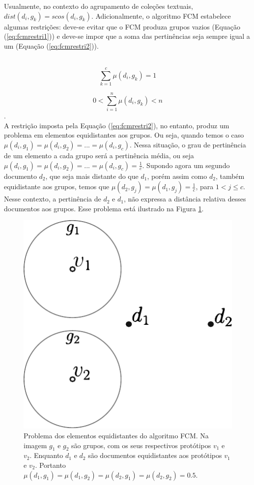 Usualmente, no contexto do agrupamento de coleções textuais, $dist(d_i,g_k) = scos(d_i,g_k)$.
Adicionalmente, o algoritmo FCM estabelece algumas restrições: deve-se evitar que o FCM produza
grupos vazios (Equação (\ref{eq:fcmrestri1})) e deve-se impor que a soma das pertinências seja
sempre igual a um (Equação (\ref{eq:fcmrestri2})).

\leavevmode\\
\begin{equation} \sum_{k=1}^c
  \mu(d_i,g_k) = 1 \label{eq:fcmrestri1} 
\end{equation}

\begin{equation} 0 < \sum_{i=1}^n
  \mu(d_i,g_k) < n \label{eq:fcmrestri2} 
\end{equation}. 
\leavevmode\\

A restrição imposta pela Equação (\ref{eq:fcmrestri2}), no entanto, produz um problema em elementos
equidistantes aos grupos. Ou seja, quando temos o caso $\mu(d_i, g_1) = \mu(d_i, g_2) = ... =
\mu(d_i, g_c)$. Nessa situação, o grau de pertinência de um elemento a cada grupo será a pertinência
média, ou seja $\mu(d_i, g_1) = \mu(d_i, g_2) = ... = \mu(d_i, g_c) = \frac{1}{c}$. Supondo agora um
segundo documento $d_2$, que seja mais distante do que $d_1$, porém assim como $d_2$, também
equidistante aos grupos, temos que $\mu(d_2, g_j) = \mu(d_1, g_j) = \frac{1}{c}$, para $1 < j \leq
c$. Nesse contexto, a pertinência de $d_2$ e $d_1$, não expressa a distância relativa desses
documentos aos grupos. Esse problema está ilustrado na Figura \ref{fig:fcm_problem}.

\begin{figure}[!htp] \centering
  \includegraphics[width=0.4\columnwidth]{assets/fcm_problem.pdf} 
  \caption{Problema dos
    elementos equidistantes do algoritmo FCM. Na imagem $g_1$ e $g_2$ são grupos, com os seus
    respectivos protótipos $v_1$ e $v_2$. Enquanto $d_1$ e $d_2$ são documentos equidistantes aos
    protótipos $v_1$ e $v_2$. Portanto $\mu(d_1,g_1) = \mu(d_1,g_2) = \mu(d_2,g_1) = \mu(d_2,g_2) =
0.5$.} 
  \label{fig:fcm_problem} 
\end{figure}

